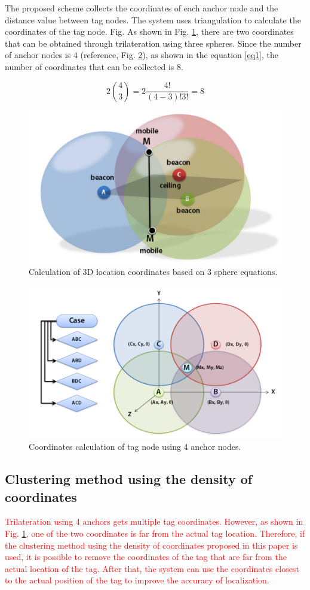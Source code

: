 \documentclass[conference]{IEEEtran}
\begin{document}
The proposed scheme collects the coordinates of each anchor node and the distance value between tag nodes. The system uses triangulation to calculate the coordinates of the tag node. Fig. As shown in Fig. \ref{fig1}, there are two coordinates that can be obtained through trilateration using three spheres. Since the number of anchor nodes is 4 (reference, Fig. \ref{fig2}), as shown in the equation \ref{eq1}, the number of coordinates that can be collected is 8.

\begin{equation}
    2\binom{4}{3} = 2\frac{4!}{(4-3)!3!}=8\label{eq1}
\end{equation}

\begin{figure}[htbp]
    \centerline{\includegraphics[width=0.62\columnwidth]{fig2.png}}
    \caption{Calculation of 3D location coordinates based on 3 sphere equations.}
    \label{fig1}
\end{figure}

\begin{figure}[htbp]
    \centerline{\includegraphics[width=0.62\columnwidth]{fig1.png}}
    \caption{Coordinates calculation of tag node using 4 anchor nodes.}
    \label{fig2}
\end{figure}

\subsection{Clustering method using the density of coordinates}
\textcolor{red}{Trilateration using 4 anchors gets multiple tag coordinates. However, as shown in Fig. \ref{fig1}, one of the two coordinates is far from the actual tag location. Therefore, if the clustering method using the density of coordinates proposed in this paper is used, it is possible to remove the coordinates of the tag that are far from the actual location of the tag. After that, the system can use the coordinates closest to the actual position of the tag to improve the accuracy of localization.}
\end{document}
